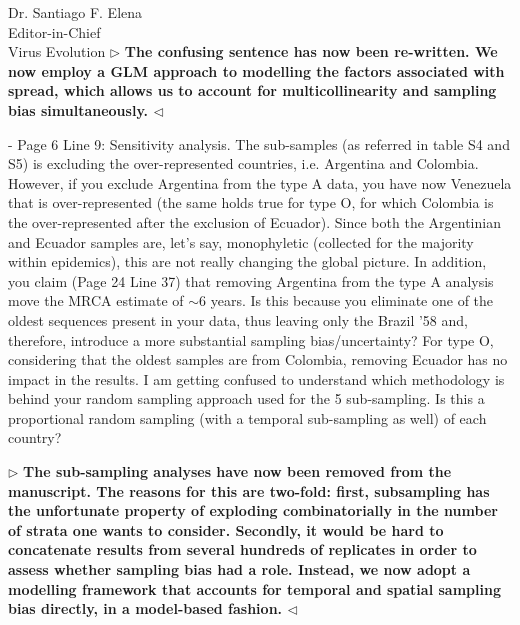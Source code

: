 \documentclass[12pt, a4paper]{letter} %
\newenvironment{reply}{$\triangleright$\bf}{$\triangleleft$}
\begin{document}
\begin{letter}{
	Dr. Santiago F. Elena\\
    Editor-in-Chief \\
    Virus Evolution
}
\begin{reply}
The confusing sentence has now been re-written.
We now employ a GLM approach to modelling the factors associated with spread, which allows us to account for multicollinearity and sampling bias simultaneously.
\end{reply}

-       Page 6 Line 9: Sensitivity analysis. 
The sub-samples (as referred in table S4 and S5) is excluding the over-represented countries, i.e. Argentina and Colombia. 
However, if you exclude Argentina from the type A data, you have now Venezuela that is over-represented (the same holds true for type O, for which Colombia is the over-represented after the exclusion of Ecuador). 
Since both the Argentinian and Ecuador samples are, let's say, monophyletic (collected for the majority within epidemics), this are not really changing the global picture. 
In addition, you claim (Page 24 Line 37) that removing Argentina from the type A analysis move the MRCA estimate of $\sim$6 years. Is this because you eliminate one of the oldest sequences present in your data, thus leaving only the Brazil '58 and, therefore, introduce a more substantial sampling bias/uncertainty? 
For type O, considering that the oldest samples are from Colombia, removing Ecuador has no impact in the results. 
I am getting confused to understand which methodology is behind your random sampling approach used for the 5 sub-sampling. Is this a proportional random sampling (with a temporal sub-sampling as well) of each country?

\begin{reply}
The sub-sampling analyses have now been removed from the manuscript.
The reasons for this are two-fold: first, subsampling has the unfortunate property of exploding combinatorially in the number of strata one wants to consider.
Secondly, it would be hard to concatenate results from several hundreds of replicates in order to assess whether sampling bias had a role.
Instead, we now adopt a modelling framework that accounts for temporal and spatial sampling bias directly, in a model-based fashion.
\end{reply}


\end{letter}
\end{document}
